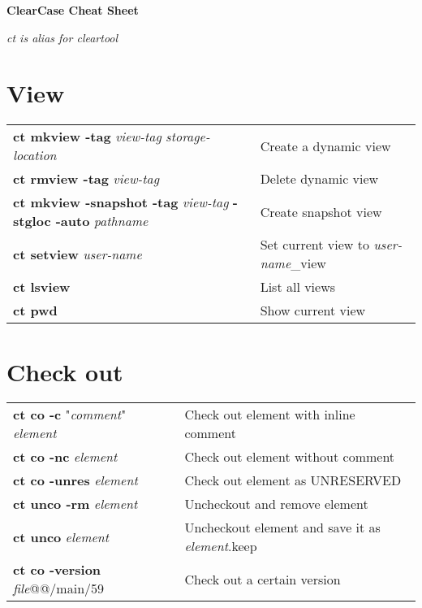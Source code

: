 \documentclass[10pt,twocolumn]{article}
\begin{document}
\renewcommand{\arraystretch}{1.2} %

\begin{center}
  \huge{\textbf{ClearCase Cheat Sheet}} \\
\end{center}

\textit{ct is alias for cleartool} 

\section*{View}
\begin{tabularx}{10.2cm}{>{\hsize=5.3cm}X|>{\hsize=4cm}X}
  \textbf{ct mkview -tag} \textit{view-tag} \textit{storage-location}          & Create a dynamic view \\
  \textbf{ct rmview -tag} \textit{view-tag}           & Delete dynamic view \\
  \textbf{ct mkview -snapshot -tag} \textit{view-tag} \textbf{-stgloc -auto} \textit{pathname}                   & Create snapshot view \\
  \textbf{ct setview} \textit{user-name}                     & Set current view to \textit{user-name}\_view \\
  \textbf{ct lsview}                                         & List all views \\
  \textbf{ct pwd}                                            & Show current view \\
\end{tabularx}

\section*{Check out}
\begin{tabularx}{10.2cm}{l|X}
  \textbf{ct co -c} "\textit{comment}" \textit{element} & Check out element with inline comment \\
  \textbf{ct co -nc} \textit{element}                   & Check out element without comment \\
  \textbf{ct co -unres} \textit{element}                & Check out element as UNRESERVED \\
  \textbf{ct unco -rm} \textit{element}                 & Uncheckout and
  remove element \\
  \textbf{ct unco} \textit{element}                     & Uncheckout element
  and save it as \textit{element}.keep \\
  \textbf{ct co -version} \textit{file}@@/main/59       & Check out a certain version \\
\end{tabularx}
\end{document}
